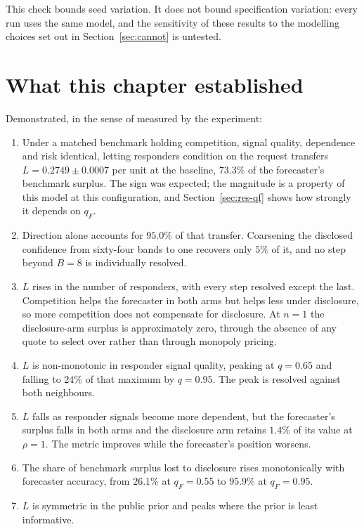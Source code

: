 This check bounds seed variation. It does not bound specification variation: every run uses
the same model, and the sensitivity of these results to the modelling choices set out in
Section~\ref{sec:cannot} is untested.

\section{What this chapter established}
\label{sec:res-summary}

Demonstrated, in the sense of measured by the experiment:

\begin{enumerate}
  \item Under a matched benchmark holding competition, signal quality, dependence and risk
    identical, letting responders condition on the request transfers
    $L = 0.2749 \pm 0.0007$ per unit at the baseline, $73.3\%$ of the forecaster's benchmark
    surplus. The sign was expected; the magnitude is a property of this model at this
    configuration, and Section~\ref{sec:res-qf} shows how strongly it depends on $q_F$.
  \item Direction alone accounts for $95.0\%$ of that transfer. Coarsening the disclosed
    confidence from sixty-four bands to one recovers only $5\%$ of it, and no step beyond
    $B=8$ is individually resolved.
  \item $L$ rises in the number of responders, with every step resolved except the last.
    Competition helps the forecaster in both arms but helps less under disclosure, so more
    competition does not compensate for disclosure. At $n=1$ the disclosure-arm surplus is
    approximately zero, through the absence of any quote to select over rather than through
    monopoly pricing.
  \item $L$ is non-monotonic in responder signal quality, peaking at $q=0.65$ and falling to
    $24\%$ of that maximum by $q=0.95$. The peak is resolved against both neighbours.
  \item $L$ falls as responder signals become more dependent, but the forecaster's surplus
    falls in both arms and the disclosure arm retains $1.4\%$ of its value at $\rho=1$. The
    metric improves while the forecaster's position worsens.
  \item The share of benchmark surplus lost to disclosure rises monotonically with
    forecaster accuracy, from $26.1\%$ at $q_F=0.55$ to $95.9\%$ at $q_F=0.95$.
  \item $L$ is symmetric in the public prior and peaks where the prior is least informative.
\end{enumerate}

